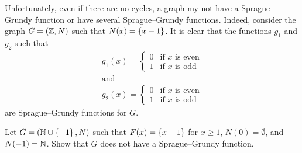 Unfortunately, even if there are no cycles, a graph my not have a
Sprague--Grundy function or have several Sprague--Grundy functions. Indeed,
consider the graph $G = ({\mathbb{Z}}, N)$ such that $N(x) = \set{x - 1}$. It is clear
that the functions $g_1$ and $g_2$ such that
\begin{gather*}
    g_1(x) =
    \begin{cases}
        0 & \text{if } x \text{ is even} \\
        1 & \text{if } x \text{ is odd}
    \end{cases} \\
    \text{and} \\
    g_2(x) =
    \begin{cases}
        0 & \text{if } x \text{ is even} \\
        1 & \text{if } x \text{ is odd}
    \end{cases}
\end{gather*}
are Sprague--Grundy functions for $G$.

\begin{exercise}
    Let $G = (\N \cup \set{-1}, N)$ such that $F(x) = \set{x - 1}$ for $x \ge 1$,
    $N(0) = \emptyset$, and $N(-1) = {\mathbb{N}}$.
    Show that $G$ does not have a Sprague--Grundy function.
\end{exercise}

